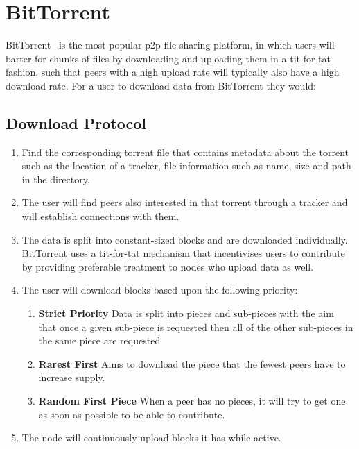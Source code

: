 
\section{BitTorrent}

BitTorrent~\cite{kaune_unraveling_2010,pouwelse_bittorrent_2005} is the most popular p2p file-sharing platform, in which users will barter for chunks of files by downloading and uploading them in a tit-for-tat fashion, such that peers with a high upload rate will typically also have a high download rate. For a user to download data from BitTorrent they would:

\subsection*{Download Protocol}
\label{subsec:bittorrent-download}

\begin{enumerate}
  \item Find the corresponding \.torrent file that contains metadata about the torrent such as the location of a tracker, file information such as name, size and path in the directory.
  \item The user will find peers also interested in that torrent through a tracker and will establish connections with them.
  \item The data is split into constant-sized blocks and are downloaded individually. BitTorrent uses a tit-for-tat mechanism that incentivises users to contribute by providing preferable treatment to nodes who upload data as well.
  \item The user will download blocks based upon the following priority:
        \begin{enumerate}
          \item \textbf{Strict Priority} Data is split into pieces and sub-pieces with the aim that once a given sub-piece is requested then all of the other sub-pieces in the same piece are requested
          \item \textbf{Rarest First} Aims to download the piece that the fewest peers have to increase supply.
          \item \textbf{Random First Piece} When a peer has no pieces, it will try to get one as soon as possible to be able to contribute.
        \end{enumerate}
  \item The node will continuously upload blocks it has while active.
\end{enumerate}

